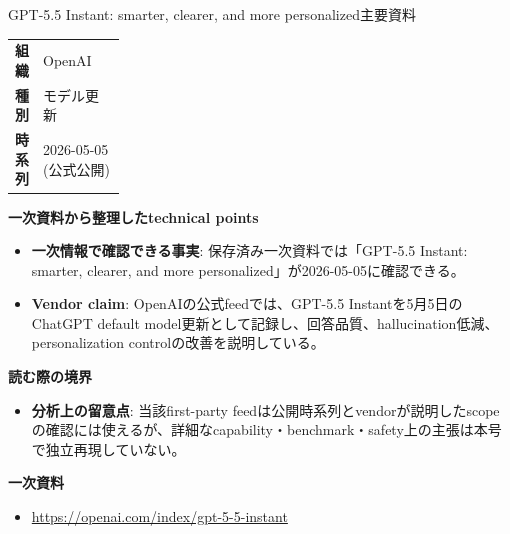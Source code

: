 \begin{technicalnote}{GPT-5.5 Instant: smarter, clearer, and more personalized}{主要資料}
\begingroup
\begin{tabularx}{\linewidth}{@{}>{\bfseries}p{0.22\linewidth}X@{}}
組織 & OpenAI \\
種別 & モデル更新 \\
時系列 & 2026-05-05 (公式公開) \\
\end{tabularx}
\smallskip
{\bfseries 一次資料から整理したtechnical points}
\begin{itemize}[leftmargin=1.5em,itemsep=0.35em]
\item \textbf{一次情報で確認できる事実}: 保存済み一次資料では「GPT-5.5 Instant: smarter, clearer, and more personalized」が2026-05-05に確認できる。
\item \textbf{Vendor claim}: OpenAIの公式feedでは、GPT-5.5 Instantを5月5日のChatGPT default model更新として記録し、回答品質、hallucination低減、personalization controlの改善を説明している。
\end{itemize}
{\bfseries 読む際の境界}
\begin{itemize}[leftmargin=1.5em,itemsep=0.35em]
\item \textbf{分析上の留意点}: 当該first-party feedは公開時系列とvendorが説明したscopeの確認には使えるが、詳細なcapability・benchmark・safety上の主張は本号で独立再現していない。
\end{itemize}
\begin{samepage}
{\bfseries 一次資料}
\begingroup\sloppy
\begin{itemize}[leftmargin=1.5em,itemsep=0.25em]
\item {\scriptsize\url{https://openai.com/index/gpt-5-5-instant}}
\end{itemize}
\endgroup
\end{samepage}
\endgroup
\end{technicalnote}
\medskip

